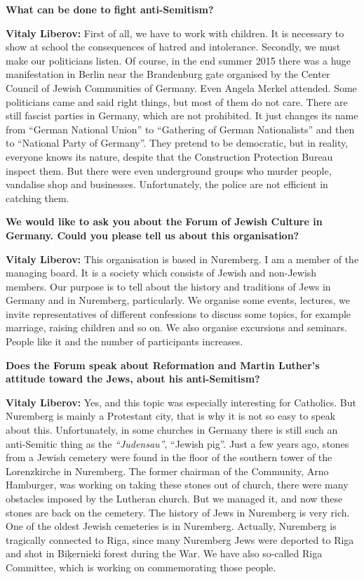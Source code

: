 \textbf{What can be done to fight anti-Semitism?} 

\textbf{Vitaly Liberov:} First of all, we have to work with children. It is necessary to show at school the consequences of hatred and intolerance. Secondly, we must make our politicians listen. Of course, in the end summer 2015 there was a huge manifestation in Berlin near the Brandenburg gate organised by the Center Council of Jewish Communities of Germany. Even Angela Merkel attended. Some politicians came and said right things, but most of them do not care. There are still fascist parties in Germany, which are not prohibited. It just changes its name from ``German National Union'' to ``Gathering of German Nationalists'' and then to ``National Party of Germany''. They pretend to be democratic, but in reality, everyone knows its nature, despite that the Construction Protection Bureau inspect them. But there were even underground groups who murder people, vandalise shop and businesses. Unfortunately, the police are not efficient in catching them. 

\textbf{We would like to ask you about the Forum of Jewish Culture in Germany. Could you please tell us about this organisation?}  

\textbf{Vitaly Liberov:} This organisation is based in Nuremberg. I am a member of the managing board. It is a society which consists of Jewish and non-Jewish members. Our purpose is to tell about the history and traditions of Jews in Germany and in Nuremberg, particularly. We organise some events, lectures, we invite representatives of different confessions to discuss some topics, for example marriage, raising children and so on. We also organise excursions and seminars. People like it and the number of participants increases.  

\textbf{Does the Forum speak about Reformation and Martin Luther’s attitude toward the Jews, about his anti-Semitism?} 

\textbf{Vitaly Liberov:} Yes, and this topic was especially interesting for Catholics. But Nuremberg is mainly a Protestant city, that is why it is not so easy to speak about this. Unfortunately, in some churches in Germany there is still such an anti-Semitic thing as the \textit{``Judensau''}, ``Jewish pig''. Just a few years ago, stones from a Jewish cemetery were found in the floor of the southern tower of the Lorenzkirche in Nuremberg. The former chairman of the Community, Arno Hamburger, was working on taking these stones out of church, there were many obstacles imposed by the Lutheran church. But we managed it, and now these stones are back on the cemetery. The history of Jews in Nuremberg is very rich. One of the oldest Jewish cemeteries is in Nuremberg. Actually, Nuremberg is tragically connected to Riga, since many Nuremberg Jews were deported to Riga and shot in Biķernieki forest during the War. We have also so-called Riga Committee, which is working on commemorating those people.